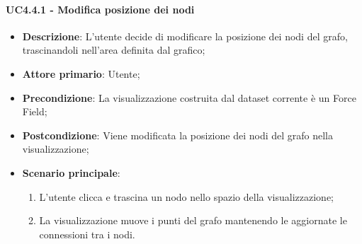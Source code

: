 \paragraph{UC4.4.1 - Modifica posizione dei nodi}
\label{par:uc4.4.1}
\begin{itemize}
    \item \textbf{Descrizione}: L’utente decide di modificare la posizione dei nodi del grafo,
                                trascinandoli nell'area definita dal grafico;

    \item \textbf{Attore primario}: Utente;

    \item \textbf{Precondizione}:   La visualizzazione costruita dal dataset corrente è un Force Field;
    \item \textbf{Postcondizione}:  Viene modificata la posizione dei nodi del grafo nella visualizzazione;

	\item \textbf{Scenario principale}:
        \begin{enumerate}
            \item L'utente clicca e trascina un nodo nello spazio della visualizzazione;
            \item La visualizzazione muove i punti del grafo mantenendo le aggiornate le connessioni tra i nodi.
        \end{enumerate}
\end{itemize}

